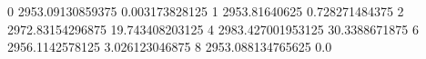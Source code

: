 0 2953.09130859375 0.003173828125
1 2953.81640625 0.728271484375
2 2972.83154296875 19.743408203125
4 2983.427001953125 30.3388671875
6 2956.1142578125 3.026123046875
8 2953.088134765625 0.0
